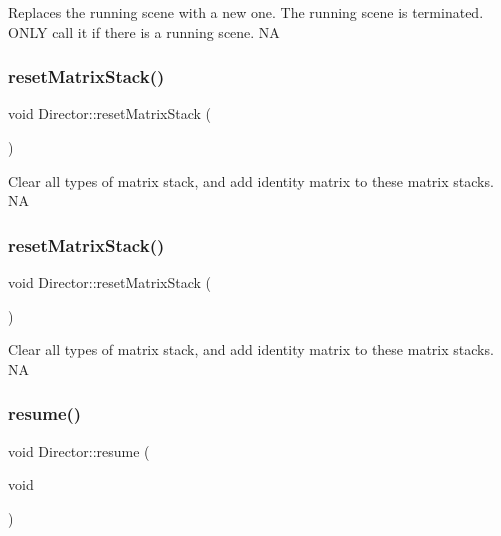 Replaces the running scene with a new one. The running scene is terminated. O\+N\+LY call it if there is a running scene.  NA \mbox{\label{classDirector_a1227205af91f2bc56f25fb9c5f0439bd}} 
\subsubsection{\texorpdfstring{reset\+Matrix\+Stack()}{resetMatrixStack()}\hspace{0.1cm}{\footnotesize\ttfamily [1/2]}}
{\footnotesize\ttfamily void Director\+::reset\+Matrix\+Stack (\begin{DoxyParamCaption}{ }\end{DoxyParamCaption})}

Clear all types of matrix stack, and add identity matrix to these matrix stacks.  NA \mbox{\label{classDirector_a1227205af91f2bc56f25fb9c5f0439bd}} 
\subsubsection{\texorpdfstring{reset\+Matrix\+Stack()}{resetMatrixStack()}\hspace{0.1cm}{\footnotesize\ttfamily [2/2]}}
{\footnotesize\ttfamily void Director\+::reset\+Matrix\+Stack (\begin{DoxyParamCaption}{ }\end{DoxyParamCaption})}

Clear all types of matrix stack, and add identity matrix to these matrix stacks.  NA \mbox{\label{classDirector_a851df0aed8d550cc85159063b0c85dac}} 
\subsubsection{\texorpdfstring{resume()}{resume()}\hspace{0.1cm}{\footnotesize\ttfamily [1/2]}}
{\footnotesize\ttfamily void Director\+::resume (\begin{DoxyParamCaption}\item[{void}]{ }\end{DoxyParamCaption})}

